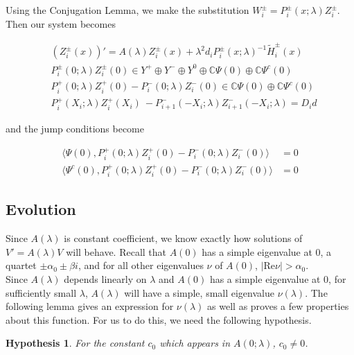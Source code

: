 \documentclass[12pt]{article}
\def\C{{\mathbb C}}
\newtheorem{hypothesis}{Hypothesis}
\begin{document}
Using the Conjugation Lemma, we make the substitution $W_i^\pm = P_i^\pm(x; \lambda) Z_i^\pm$. Then our system becomes

\begin{subequations}
\begin{align}
&(Z_i^\pm(x))' = A(\lambda) Z_i^\pm(x) + \lambda^2 d_i P_i^\pm(x; \lambda)^{-1} \tilde{H}_i^\pm(x) \label{systemZ} \\
&P_i^\pm(0; \lambda) Z_i^\pm(0) \in Y^+ \oplus Y^- \oplus Y^0 \oplus \C \Psi(0) \oplus \C \Psi^c(0) \label{systemcenter1} \\
&P_i^+(0; \lambda) Z_i^+(0) - P_i^-(0; \lambda) Z_i^-(0) \in \C \Psi(0) \oplus \C \Psi^c(0) \label{systemcenter2} \\
&P_i^+(X_i; \lambda) Z_i^+(X_i)\ - P_{i+1}^-(-X_i; \lambda) Z_{i+1}^-(-X_i; \lambda) = D_i d \label{systemmiddle}
\end{align}
\end{subequations}

and the jump conditions become

\begin{align*}
\langle \Psi(0), P_i^+(0; \lambda) Z_i^+(0) - P_i^-(0; \lambda) Z_i^-(0) \rangle &= 0 \\
\langle \Psi^c(0), P_i^+(0; \lambda) Z_i^+(0) - P_i^-(0; \lambda) Z_i^-(0) \rangle &= 0
\end{align*}

\subsection{Evolution}

Since $A(\lambda)$ is constant coefficient, we know exactly how solutions of $V' = A(\lambda)V$ will behave. Recall that $A(0)$ has a simple eigenvalue at 0, a quartet $\pm \alpha_0 \pm \beta i$, and for all other eigenvalues $\nu$ of $A(0)$, $|\text{Re} \nu| > \alpha_0$.\\

Since $A(\lambda)$ depends linearly on $\lambda$ and $A(0)$ has a simple eigenvalue at 0, for sufficiently small $\lambda$, $A(\lambda)$ will have a simple, small eigenvalue $\nu(\lambda)$. The following lemma gives an expression for $\nu(\lambda)$ as well as proves a few properties about this function. For us to do this, we need the following hypothesis.

\begin{hypothesis}\label{c0nonzero}
For the constant $c_0$ which appears in $A(0; \lambda)$, $c_0 \neq 0$.
\end{hypothesis}
\end{document}
